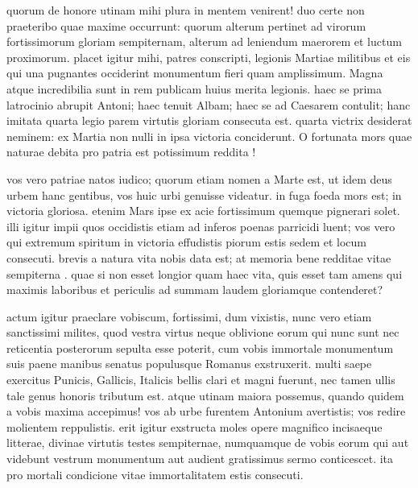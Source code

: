  quorum de honore utinam mihi plura in mentem venirent! duo certe non praeteribo quae maxime occurrunt: quorum alterum pertinet ad virorum fortissimorum gloriam sempiternam, alterum ad leniendum maerorem et luctum proximorum. placet igitur mihi, patres conscripti, legionis Martiae militibus et eis qui una pugnantes occiderint monumentum fieri quam amplissimum. Magna atque incredibilia sunt in rem publicam huius merita legionis. haec se prima latrocinio abrupit Antoni; haec tenuit Albam; haec se ad Caesarem contulit; hanc imitata quarta legio parem virtutis gloriam consecuta est. quarta victrix desiderat neminem: ex Martia non nulli in ipsa victoria conciderunt. O fortunata mors quae naturae debita pro patria est potissimum reddita !

 vos vero patriae natos iudico; quorum etiam nomen a Marte est, ut idem deus urbem hanc gentibus, vos huic urbi genuisse videatur. in fuga foeda mors est; in victoria gloriosa. etenim Mars ipse ex acie fortissimum quemque pignerari solet. illi igitur impii quos occidistis etiam ad inferos poenas parricidi luent; vos vero qui extremum spiritum in victoria effudistis piorum estis sedem et locum consecuti. brevis a natura vita nobis data est; at memoria bene redditae vitae sempiterna . quae si non esset longior quam haec vita, quis esset tam amens qui maximis laboribus et periculis ad summam laudem gloriamque contenderet?

 actum igitur praeclare vobiscum, fortissimi, dum vixistis, nunc vero etiam sanctissimi milites, quod vestra virtus neque oblivione eorum qui nunc sunt nec reticentia posterorum sepulta esse poterit, cum vobis immortale monumentum suis paene manibus senatus populusque Romanus exstruxerit. multi saepe exercitus Punicis, Gallicis, Italicis bellis clari et magni fuerunt, nec tamen ullis tale genus honoris tributum est. atque utinam maiora possemus, quando quidem a vobis maxima accepimus! vos ab urbe furentem Antonium avertistis; vos redire molientem reppulistis. erit igitur exstructa moles opere magnifico incisaeque litterae, divinae virtutis testes sempiternae, numquamque de vobis eorum qui aut videbunt vestrum monumentum aut audient gratissimus sermo conticescet. ita pro mortali condicione vitae immortalitatem estis consecuti.

